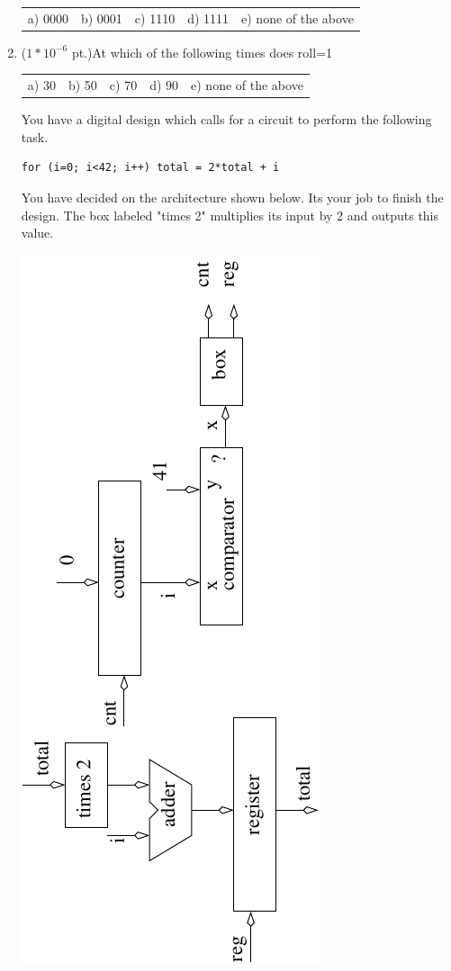 \documentclass{article}
\begin{document}
\begin{enumerate}
\begin{tabular}{p{0.6in} p{0.6in} p{0.6in} p{0.6in} l}
a) 0000 & b) 0001 & c) 1110 & d) 1111 & e) none of the above
\end{tabular}


\item {($1*10^{-6}$ pt.)}At which of the following times does roll=1

\begin{tabular}{p{0.6in} p{0.6in} p{0.6in} p{0.6in} l}
a) 30 & b) 50 & c) 70 & d) 90 & e) none of the above
\end{tabular}



\pagebreak
You have a digital design which calls for a circuit
to perform the following task.  

\begin{verbatim}
for (i=0; i<42; i++) total = 2*total + i
\end{verbatim}

You have decided on the architecture shown below.  Its your job to 
finish the design. The box labeled "times 2" multiplies its input
by 2 and outputs this value.

\includegraphics[angle=-90]{./Fig2/combo6}


\end{enumerate}
\end{document}

